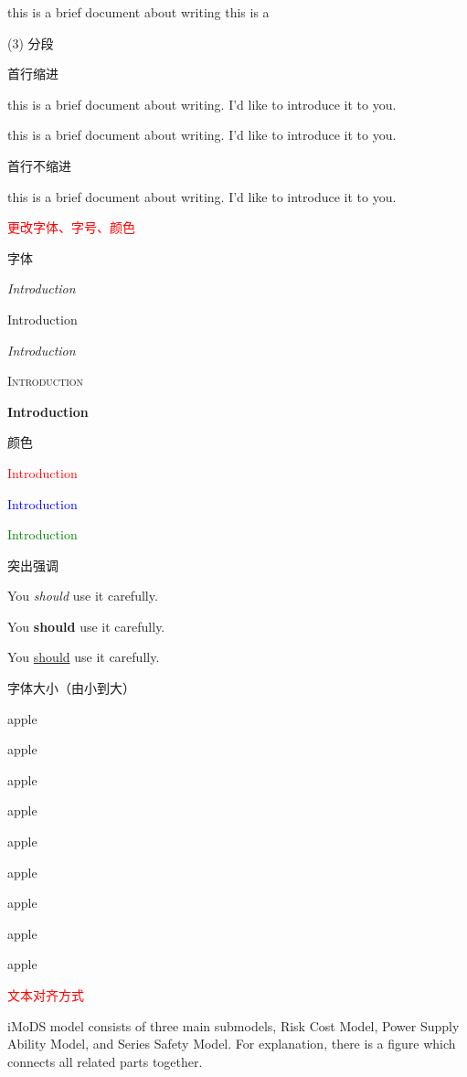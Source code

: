 \documentclass[12pt, a4paper, onecolumn]{elegantpaper}  %
\begin{document}
this is a brief document about writing \newline this is a 

(3) 分段

首行缩进

this is a brief document about writing. I'd like to introduce it to you.

this is a brief document about writing. I'd like to introduce it to you.

首行不缩进

\noindent this is a brief document about writing. I'd like to introduce it to you.

\textcolor{red}{\Huge{更改字体、字号、颜色}}

字体

\textit{Introduction}  %

\textup{Introduction}  %

\textsl{Introduction}  %

\textsc{Introduction}  %

\textbf{Introduction}  %

颜色

\textcolor{red}{Introduction}

\textcolor{blue}{Introduction}

\textcolor{green}{Introduction}

突出强调

You \emph{should} use it carefully.

You \textbf{should} use it carefully.

You \underline{should} use it carefully.

字体大小（由小到大）

\tiny apple

\scriptsize apple

\footnotesize apple

\small apple

\normalsize apple

\large apple

\Large apple

\LARGE apple

\huge apple

\normalsize
 
\textcolor{red}{\Huge{文本对齐方式}}

\begin{center}
iMoDS model consists of three main submodels, Risk Cost Model, Power Supply Ability Model, and Series Safety Model. For explanation, there is a figure which connects all related parts together.
\end{center}
\end{document}
